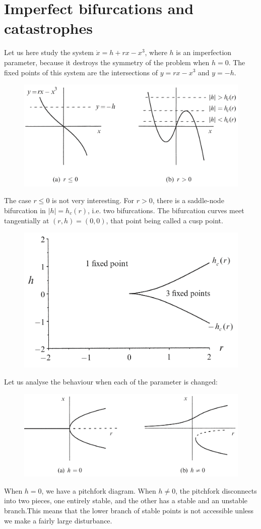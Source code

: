 \documentclass[12pt, openany]{report}
\theoremstyle{definition}
\begin{document}
\section{Imperfect bifurcations and catastrophes}
Let us here study the system $\dot x= h+rx-x^3$, where $h$ is an imperfection parameter, because it destroys the symmetry of the problem when $h=0$. The fixed points of this system are the intersections of $y=rx-x^3$ and $y=-h$. 
\begin{figure}[H]
    \centering
    \includegraphics[width = .6\textwidth]{img/saddle_node_impft.png}
\end{figure}
The case $r\le 0$ is not very interesting. For $r>0$, there is a saddle-node bifurcation in $|h| = h_c(r)$, i.e. two bifurcations. The bifurcation curves meet tangentially at $(r,h)= (0,0)$, that point being called a cusp point. 
\begin{figure}[H]
    \centering
    \includegraphics[width=.5\textwidth]{img/cusp.png}
\end{figure}
Let us analyse the behaviour when each of the parameter is changed:
\begin{figure}[H]
    \centering
    \includegraphics[width=.5\textwidth]{img/h_analysis.png}
\end{figure}
When $h=0$, we have a pitchfork diagram. When $h\neq 0$, the pitchfork disconnects into two pieces, one entirely stable, and the other has a stable and an unstable branch.This means that the lower branch of stable points is not accessible unless we make a fairly large disturbance.
\end{document}
